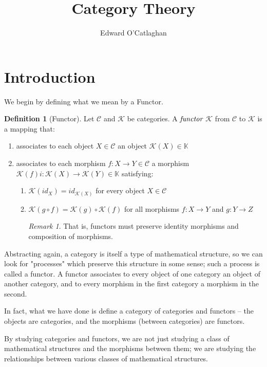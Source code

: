 \documentclass[10pt, oneside, reqno]{amsart}
\title{Category Theory}                               %
\author{Edward O'Catlaghan}
\theoremstyle{plain}%
\theoremstyle{definition}
\newtheorem{defn}[thm]{Definition}
\theoremstyle{remark}
\newtheorem*{rem}{Remark}
\begin{document}
\maketitle \tableofcontents \clearpage


\section{Introduction} %
\label{sec:introduction}
We begin by defining what we mean by a Functor.
\begin{defn}[Functor]
	Let $\mathcal{C}$ and $\mathcal{K}$ be categories. A $\emph{functor}$ $\mathcal{K}$ from $\mathcal{C}$ to $\mathcal{K}$ is a mapping that:
	\begin{enumerate}
		\item associates to each object $X \in \mathcal{C}$ an object $\mathcal{K}(X) \in  \mathbb{K}$
		
		\item associates to each morphism $f : X \to Y \in \mathcal{C}$ a morphism $\mathcal{K}(f)i : \mathcal{K}(X) \to \mathcal{K}(Y) \in \mathbb{K}$
		satisfying:
		\begin{enumerate}
			\item $\mathcal{K}(id_{X}) = id_{\mathcal{K}(X)}$ for every object $X \in \mathcal{C}$
			
			\item $\mathcal{K}(g \circ f) = \mathcal{K}(g) \circ \mathcal{K}(f)$ for all morphisms $f : X \to Y$ and $g : Y \to Z$
			\\
			\begin{rem}
				That is, functors must preserve identity morphisms and composition of morphisms.
			\end{rem}
		\end{enumerate}
	\end{enumerate}
\end{defn}

Abstracting again, a category is itself a type of mathematical structure, so we can look for "processes" which preserve this structure in some sense; such a process is called a functor. A functor associates to every object of one category an object of another category, and to every morphism in the first category a morphism in the second.

In fact, what we have done is define a category of categories and functors – the objects are categories, and the morphisms (between categories) are functors.

By studying categories and functors, we are not just studying a class of mathematical structures and the morphisms between them; we are studying the relationships between various classes of mathematical structures.
\end{document}
